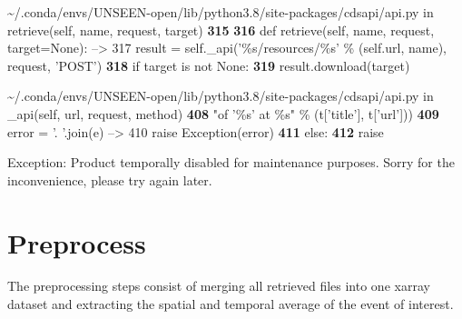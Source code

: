\documentclass[letterpaper,10pt,english]{sphinxmanual}
\begin{document}
{\begin{sphinxVerbatim}[commandchars=\\\{\}]
\textcolor{ansi-green}{\textasciitilde{}/.conda/envs/UNSEEN-open/lib/python3.8/site-packages/cdsapi/api.py} in \textcolor{ansi-cyan}{retrieve}\textcolor{ansi-blue}{(self, name, request, target)}
\textcolor{ansi-green-intense}{\textbf{    315}}
\textcolor{ansi-green-intense}{\textbf{    316}}     \textcolor{ansi-green}{def} retrieve\textcolor{ansi-blue}{(}self\textcolor{ansi-blue}{,} name\textcolor{ansi-blue}{,} request\textcolor{ansi-blue}{,} target\textcolor{ansi-blue}{=}\textcolor{ansi-green}{None}\textcolor{ansi-blue}{)}\textcolor{ansi-blue}{:}
\textcolor{ansi-green}{--> 317}\textcolor{ansi-red}{         }result \textcolor{ansi-blue}{=} self\textcolor{ansi-blue}{.}\_api\textcolor{ansi-blue}{(}\textcolor{ansi-blue}{'\%s/resources/\%s'} \textcolor{ansi-blue}{\%} \textcolor{ansi-blue}{(}self\textcolor{ansi-blue}{.}url\textcolor{ansi-blue}{,} name\textcolor{ansi-blue}{)}\textcolor{ansi-blue}{,} request\textcolor{ansi-blue}{,} \textcolor{ansi-blue}{'POST'}\textcolor{ansi-blue}{)}
\textcolor{ansi-green-intense}{\textbf{    318}}         \textcolor{ansi-green}{if} target \textcolor{ansi-green}{is} \textcolor{ansi-green}{not} \textcolor{ansi-green}{None}\textcolor{ansi-blue}{:}
\textcolor{ansi-green-intense}{\textbf{    319}}             result\textcolor{ansi-blue}{.}download\textcolor{ansi-blue}{(}target\textcolor{ansi-blue}{)}

\textcolor{ansi-green}{\textasciitilde{}/.conda/envs/UNSEEN-open/lib/python3.8/site-packages/cdsapi/api.py} in \textcolor{ansi-cyan}{\_api}\textcolor{ansi-blue}{(self, url, request, method)}
\textcolor{ansi-green-intense}{\textbf{    408}}                                  "of '\%s' at \%s" \% (t['title'], t['url']))
\textcolor{ansi-green-intense}{\textbf{    409}}                     error \textcolor{ansi-blue}{=} \textcolor{ansi-blue}{'. '}\textcolor{ansi-blue}{.}join\textcolor{ansi-blue}{(}e\textcolor{ansi-blue}{)}
\textcolor{ansi-green}{--> 410}\textcolor{ansi-red}{                 }\textcolor{ansi-green}{raise} Exception\textcolor{ansi-blue}{(}error\textcolor{ansi-blue}{)}
\textcolor{ansi-green-intense}{\textbf{    411}}             \textcolor{ansi-green}{else}\textcolor{ansi-blue}{:}
\textcolor{ansi-green-intense}{\textbf{    412}}                 \textcolor{ansi-green}{raise}

\textcolor{ansi-red}{Exception}: Product temporally disabled for maintenance purposes. Sorry for the inconvenience, please try again later.
\end{sphinxVerbatim}
}


\section{Preprocess}
\label{\detokenize{Notebooks/2.Preprocess/2.Preprocess:Preprocess}}\label{\detokenize{Notebooks/2.Preprocess/2.Preprocess::doc}}
The preprocessing steps consist of merging all retrieved files into one xarray dataset and extracting the spatial and temporal average of the event of interest.
\end{document}

